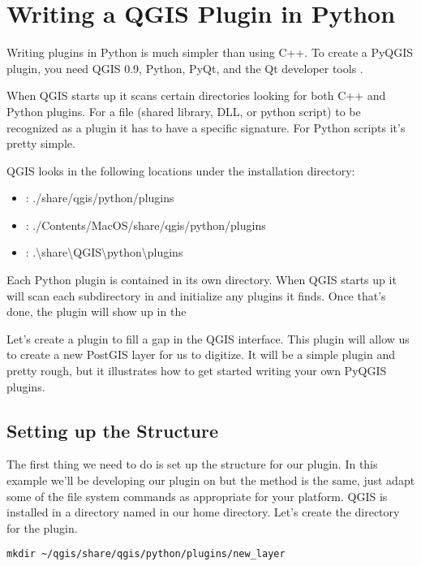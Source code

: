 \section{Writing a QGIS Plugin in Python}

Writing plugins in Python is much simpler than using C++.
To create a PyQGIS plugin, you need QGIS 0.9, Python, PyQt, and the Qt developer tools \cite{sherman07}.

When QGIS starts up it scans certain directories looking for both C++ and Python plugins.
For a file (shared library, DLL, or python script) to be recognized as a plugin it has to have a specific signature.
For Python scripts it's pretty simple.

QGIS looks in the following locations under the installation directory:

\begin{itemize}
\item {}: ./share/qgis/python/plugins
\item {}: ./Contents/MacOS/share/qgis/python/plugins
\item {}: .\textbackslash share\textbackslash QGIS\textbackslash python\textbackslash plugins
\end{itemize}

Each Python plugin is contained in its own directory.
When QGIS starts up it will scan each subdirectory in  and initialize any plugins it finds.
Once that's done, the plugin will show up in the 

Let's create a plugin to fill a gap in the QGIS interface.
This plugin will allow us to create a new PostGIS layer for us to digitize.
It will be a simple plugin and pretty rough, but it illustrates how to get started writing your own PyQGIS plugins.

\subsection{Setting up the Structure}
The first thing we need to do is set up the structure for our plugin.
In this example we'll be developing our plugin on  but the method is the same, just adapt some of the file system commands as appropriate for your platform.
QGIS is installed in a directory named  in our home directory.
Let's create the directory for the plugin.

\begin{verbatim}
mkdir ~/qgis/share/qgis/python/plugins/new_layer
\end{verbatim}

